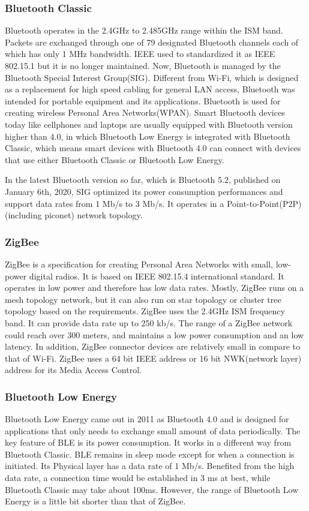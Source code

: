 \documentclass[10pt,journal,final,a4paper,nofonttune]{IEEEtran}
\begin{document}
\subsubsection{Bluetooth Classic}
Bluetooth operates in the 2.4GHz to 2.485GHz range within the ISM band. Packets are exchanged through one of 79 designated Bluetooth channels each of which has only 1 MHz bandwidth. IEEE used to standardized it as IEEE 802.15.1 but it is no longer maintained. Now, Bluetooth is managed by the Bluetooth Special Interest Group(SIG). Different from Wi-Fi, which is designed as a replacement for high speed cabling for general LAN access, Bluetooth was intended for portable equipment and its applications. Bluetooth is used for creating wireless Personal Area Networks(WPAN). 
Smart Bluetooth devices today like cellphones and laptops are usually equipped with Bluetooth version higher than 4.0, in which Bluetooth Low Energy is integrated with Bluetooth Classic, which means smart devices with Bluetooth 4.0 can connect with devices that use either Bluetooth Classic or Bluetooth Low Energy. 

In the latest Bluetooth version so far, which is Bluetooth 5.2, published on January 6th, 2020, SIG optimized its power consumption performances and support data rates from 1 Mb/s to 3 Mb/s\cite{bluetoothspec2020}. It operates in a Point-to-Point(P2P)(including piconet) network topology\cite{sigwebsite}.

\subsubsection{ZigBee}
ZigBee is a specification for creating Personal Area Networks with small, low-power digital radios. It is based on IEEE 802.15.4 international standard.
It operates in low power and therefore has low data rates. Mostly, ZigBee runs on a mesh topology network, but it can also run on star topology or cluster tree topology based on the requirements. ZigBee uses the 2.4GHz ISM frequency band. It can provide data rate up to 250 kb/s\cite{safaric2006zigbee}. The range of a ZigBee network could reach over 300 meters, and maintains a low power consumption and an low latency. In addition, ZigBee connector devices are relatively small in compare to that of Wi-Fi. ZigBee uses a 64 bit IEEE address or 16 bit NWK(network layer) address for its Media Access Control.

\subsubsection{Bluetooth Low Energy}
Bluetooth Low Energy came out in 2011 as Bluetooth 4.0 and is designed for applications that only needs to exchange small amount of data periodically. The key feature of BLE is its power consumption. It works in a different way from Bluetooth Classic. BLE remains in sleep mode except for when a connection is initiated. Its Physical layer has a data rate of 1 Mb/s. Benefited from the high data rate, a connection time would be established in 3 ms at best, while Bluetooth Classic may take about 100ms. However, the range of Bluetooth Low Energy is a little bit shorter than that of ZigBee. 
\end{document}

